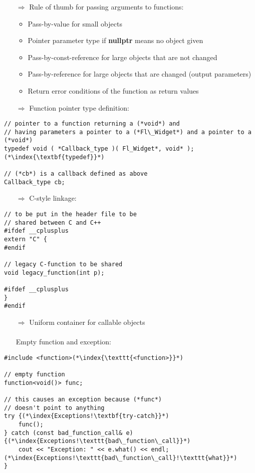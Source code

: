 \documentclass[10pt]{article}
\begin{document}
\begin{enumerate}
\item[$\Rightarrow$] Rule of thumb for passing arguments to functions:
\begin{itemize}
\item Pass-by-value for small objects
\item Pointer parameter type if \textbf{nullptr} means no object given
\item Pass-by-const-reference for large objects that are not changed
\item Pass-by-reference for large objects that are changed (output parameters)
\item Return error conditions of the function as return values
\end{itemize}
\end{enumerate}
\begin{enumerate}
\item[$\Rightarrow$] Function pointer type definition:
\end{enumerate}
\begin{lstlisting}
// pointer to a function returning a (*void*) and
// having parameters a pointer to a (*Fl\_Widget*) and a pointer to a (*void*)
typedef void ( *Callback_type )( Fl_Widget*, void* ); (*\index{\textbf{typedef}}*)

// (*cb*) is a callback defined as above
Callback_type cb;
\end{lstlisting}
\begin{enumerate}
\item[$\Rightarrow$] C-style linkage:
\end{enumerate}
\begin{lstlisting}
// to be put in the header file to be
// shared between C and C++
#ifdef __cplusplus
extern "C" {
#endif

// legacy C-function to be shared
void legacy_function(int p);

#ifdef __cplusplus
}
#endif
\end{lstlisting}
\begin{enumerate}
\item[$\Rightarrow$] Uniform container for callable objects\\ \\ Empty function and exception:
\end{enumerate}
\begin{lstlisting}
#include <function>(*\index{\texttt{<function>}}*)

// empty function
function<void()> func;

// this causes an exception because (*func*) 
// doesn't point to anything
try {(*\index{Exceptions!\textbf{try-catch}}*)
    func();
} catch (const bad_function_call& e) {(*\index{Exceptions!\texttt{bad\_function\_call}}*)
    cout << "Exception: " << e.what() << endl;(*\index{Exceptions!\texttt{bad\_function\_call}!\texttt{what}}*)
}
\end{lstlisting}
\end{document}
